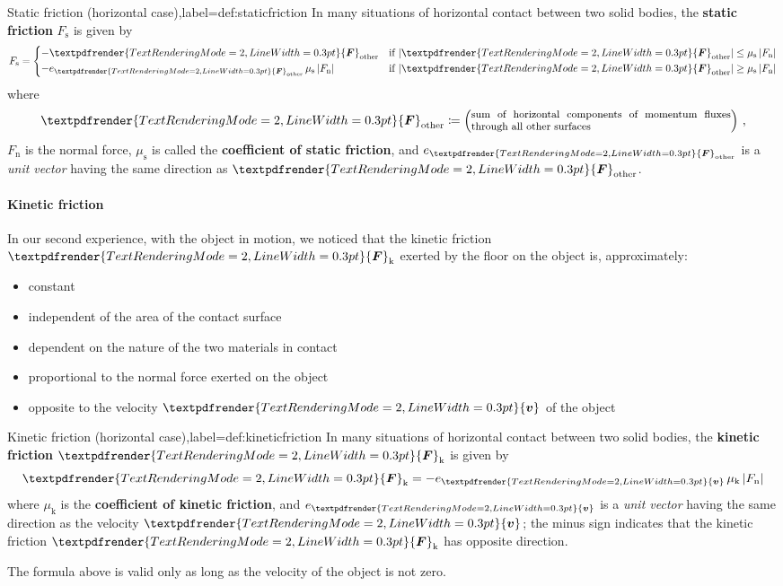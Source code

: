 \documentclass[a4paper,12pt,%
onecolumn,oneside,titlepage,%
british%
]{memoir}
\renewcommand*{\bm}[1]{\textpdfrender{TextRenderingMode=2,LineWidth=0.3pt}{\boldsymbol{#1}}}
\newcommand*{\defd}{\coloneqq}
\DeclarePairedDelimiter\abs{\lvert}{\rvert}
\renewcommand*{\|}[1][]{\nonscript\:#1\vert\nonscript\:\mathopen{}}
\newcommand*{\yv}{\bm{v}}
\newcommand*{\yF}{\bm{F}}
\newcommand*{\yFn}{F_{\text{n}}}
\newcommand*{\yFs}{F_{\text{s}}}
\newcommand*{\yFk}{\yF_{\text{k}}}
\newcommand*{\yFr}{\yF_{\text{other}}}
\newcommand*{\yfris}{\mu_{\text{s}}}%
\newcommand*{\yfrik}{\mu_{\text{k}}}%
\newcommand*{\ye}{e}
\begin{document}
\begin{definition}{Static friction (horizontal case),label={def:staticfriction}}
  In many situations of horizontal contact between two solid bodies, the \textbf{static friction} $\yFs$ is given by
  \begin{equation}\label{eq:staticfriction}
    \yFs =
    \begin{dcases}
      -\yFr
      &\text{if } \abs{\yFr} \le \yfris\, \abs{\yFn}
      \\
      -\ye_{\yFr}\,\yfris\,\abs{\yFn}
      &\text{if } \abs{\yFr} \ge \yfris\, \abs{\yFn}
    \end{dcases}
  \end{equation}
  where
  \begin{equation*}
    \yFr \defd \Bigl(\parbox{0.6\linewidth}{\footnotesize sum of horizontal components of momentum fluxes through all other surfaces}\Bigr) \ ,
  \end{equation*}
  $\yFn$ is the normal force, $\yfris$ is called the \textbf{coefficient of static friction}, and $\ye_{\yFr}$ is a \emph{unit vector} having the same direction as $\yFr$.
\end{definition}

\paragraph{Kinetic friction}

In our second experience, with the object in motion, we noticed that the kinetic friction $\yFk$ exerted by the floor on the object is, approximately:
\begin{itemize}[nosep]
\item constant
\item independent of the area of the contact surface
\item dependent on the nature of the two materials in contact
\item proportional to the normal force exerted on the object
\item opposite to the velocity $\yv$ of the object
\end{itemize}


\begin{definition}{Kinetic friction (horizontal case),label={def:kineticfriction}}
  In many situations of horizontal contact between two solid bodies, the \textbf{kinetic friction} $\yFk$ is given by
  \begin{equation}\label{eq:kineticfriction}
\yFk = -\ye_{\yv}\,\yfrik\,\abs{\yFn}
  \end{equation}
  where $\yfrik$ is the \textbf{coefficient of kinetic friction}, and $\ye_{\yv}$ is a \emph{unit vector} having the same direction as the velocity $\yv$; the minus sign indicates that the kinetic friction $\yFk$ has opposite direction.

  \smallskip

  The formula above is valid only as long as the velocity of the object is not zero.
\end{definition}
\end{document}
